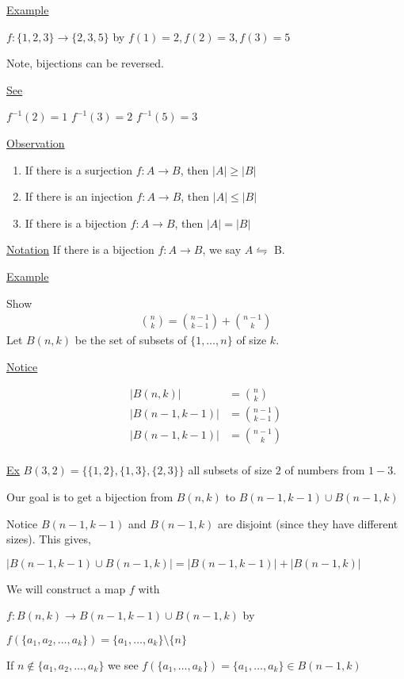 \documentclass{article}
\begin{document}
\underline{Example}

$f: \{1,2,3\} \to \{2,3,5\}$ by $f(1)=2, f(2)=3, f(3)=5$

Note, bijections can be reversed. 

\underline{See}

$f^{-1}(2) = 1$
$f^{-1}(3)=2$
$f^{-1}(5)=3$

\underline{Observation}

\begin{enumerate}
    \item If there is a surjection $f: A \to B$, then $|A| \ge |B|$
    \item If there is an injection $f: A \to B$, then $|A| \le |B|$
    \item If there is a bijection $f: A \to B$, then $|A| = |B|$
\end{enumerate}

\underline{Notation} If there is a bijection $f: A \to B$, we say $A \leftrightharpoons$ B.


\underline{Example}

Show 
\begin{align*}
\binom{n}{k} = \binom{n-1}{k-1} + \binom{n-1}{k}
\end{align*}
Let $B(n,k)$ be the set of subsets of $\{1,\ldots,n\}$ of size $k$.

\underline{Notice}

\begin{align*}
   |B(n,k)| &= \binom{n}{k} \\
   |B(n-1,k-1)| &= \binom{n-1}{k-1} \\ 
   |B(n-1,k-1)| &= \binom{n-1}{k} \\
\end{align*}

\underline{Ex} $B(3,2) = \{ \{1,2\}, \{1,3\}, \{2,3\} \}$ all subsets of size $2$ of numbers from $1-3$. 

Our goal is to get a bijection from $B(n,k)$ to $B(n-1,k-1) \cup B(n-1,k)$

Notice $B(n-1,k-1)$ and $B(n-1,k)$ are disjoint (since they have different sizes). This gives, 

$|B(n-1,k-1) \cup B(n-1,k)| = | B(n-1,k-1)| + |B(n-1, k)|$


We will construct a map $f$ with 

$f: B(n,k) \to B(n-1,k-1) \cup B(n-1, k)$  by 

$f(\{a_1,a_2,\ldots,a_k\}) = \{a_1,\ldots,a_k\} \setminus \{n\}$ 

If $n \notin \{a_1,a_2,\ldots,a_k\}$ we see $f(\{a_1,\ldots,a_k\}) = \{a_1,\ldots,a_k\} \in B(n-1, k)$
\end{document}

